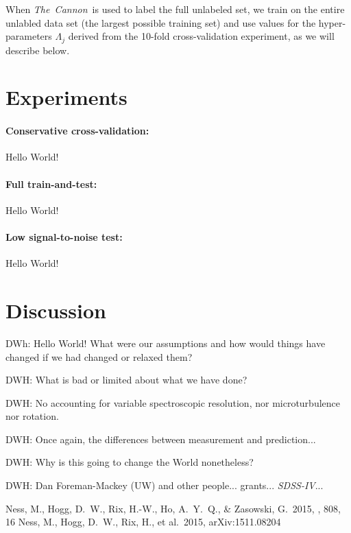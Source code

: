 \documentclass[12pt,preprint]{aastex}
\newcommand{\project}[1]{\textsl{#1}}
\newcommand{\TheCannon}{\project{The~Cannon}}
\newcommand{\acronym}[1]{{\small{#1}}}
\newcommand{\sdss}{\project{\acronym{SDSS-IV}}}
\begin{document}
When \TheCannon\ is used to label the full unlabeled set, we train on
the entire unlabled data set (the largest possible training set) and
use values for the hyper-parameters $\Lambda_j$ derived from the
10-fold cross-validation experiment, as we will describe below.

\section{Experiments}

\paragraph{Conservative cross-validation:}
Hello World!

\paragraph{Full train-and-test:}
Hello World!

\paragraph{Low signal-to-noise test:}
Hello World!

\section{Discussion}

DWh:  Hello World!  What were our assumptions and how would things have
changed if we had changed or relaxed them?

DWH:  What is bad or limited about what we have done?

DWH: No accounting for variable spectroscopic resolution, nor
microturbulence nor rotation.

DWH:  Once again, the differences between measurement and prediction...

DWH:  Why is this going to change the World nonetheless?

\acknowledgements
DWH: Dan Foreman-Mackey (UW) and other people...
grants...
\sdss...

\begin{thebibliography}{dummy}
 Ness, M., Hogg, D.~W., 
Rix, H.-W., Ho, A.~Y.~Q., \& Zasowski, G.\ 2015, \apj, 808, 16
 Ness, M., Hogg, D.~W., 
Rix, H., et al.\ 2015, arXiv:1511.08204 
\end{thebibliography}
\end{document}
